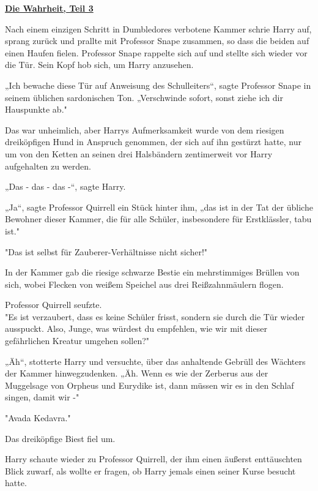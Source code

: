 

\hypertarget{die-wahrheit-teil-3}{%

\textbf{\uline{Die Wahrheit, Teil 3}}

\hfill\break Nach einem einzigen Schritt in Dumbledores verbotene Kammer schrie Harry auf, sprang zurück und prallte mit Professor Snape zusammen, so dass die beiden auf einen Haufen fielen. Professor Snape rappelte sich auf und stellte sich wieder vor die Tür. Sein Kopf hob sich, um Harry anzusehen.

„Ich bewache diese Tür auf Anweisung des Schulleiters“, sagte Professor Snape in seinem üblichen sardonischen Ton. „Verschwinde sofort, sonst ziehe ich dir Hauspunkte ab."

Das war unheimlich, aber Harrys Aufmerksamkeit wurde von dem riesigen dreiköpfigen Hund in Anspruch genommen, der sich auf ihn gestürzt hatte, nur um von den Ketten an seinen drei Halsbändern zentimerweit vor Harry aufgehalten zu werden.

„Das - das - das -“, sagte Harry.

„Ja“, sagte Professor Quirrell ein Stück hinter ihm, „das ist in der Tat der übliche Bewohner dieser Kammer, die für alle Schüler, insbesondere für Erstklässler, tabu ist."

"Das ist selbst für Zauberer-Verhältnisse nicht sicher!"

In der Kammer gab die riesige schwarze Bestie ein mehrstimmiges Brüllen von sich, wobei Flecken von weißem Speichel aus drei Reißzahnmäulern flogen.

Professor Quirrell seufzte.\\ "Es ist verzaubert, dass es keine Schüler frisst, sondern sie durch die Tür wieder ausspuckt. Also, Junge, was würdest du empfehlen, wie wir mit dieser gefährlichen Kreatur umgehen sollen?"

„Äh“, stotterte Harry und versuchte, über das anhaltende Gebrüll des Wächters der Kammer hinwegzudenken. „Äh. Wenn es wie der Zerberus aus der Muggelsage von Orpheus und Eurydike ist, dann müssen wir es in den Schlaf singen, damit wir -"

"Avada Kedavra."

Das dreiköpfige Biest fiel um.

Harry schaute wieder zu Professor Quirrell, der ihm einen äußerst enttäuschten Blick zuwarf, als wollte er fragen, ob Harry jemals einen seiner Kurse besucht hatte.

}
